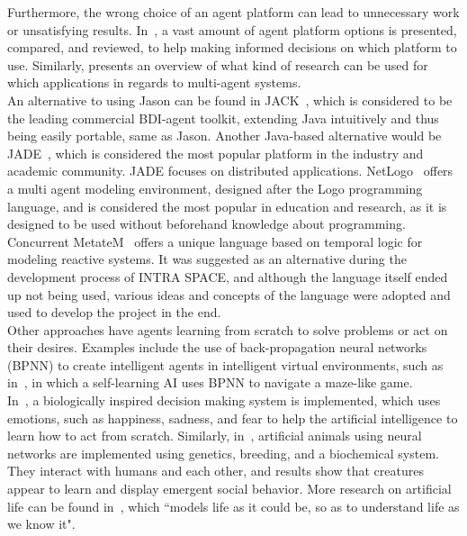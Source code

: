 \documentclass[draft,final]{vutinfth} %
\begin{document}
Furthermore, the wrong choice of an agent platform can lead to unnecessary work or unsatisfying results. 
In~\cite{kravari2015survey}, a vast amount of agent platform options is presented, compared, and reviewed, to help making informed decisions on which platform to use. 
Similarly, \cite{oliveira1999multi} presents an overview of what kind of research can be used for which applications in regards to multi-agent systems. \\
An alternative to using Jason can be found in JACK~\cite{Winikoff2005}, which is considered to be the leading commercial BDI-agent toolkit, extending Java intuitively and thus being easily portable, same as Jason. 
Another Java-based alternative would be JADE~\cite{bellifemine1999jade}, which is considered the most popular platform in the industry and academic community. 
JADE focuses on distributed applications. 
NetLogo~\cite{tisue2004netlogo} offers a multi agent modeling environment, designed after the Logo programming language, and is considered the most popular in education and research, as it is designed to be used without beforehand knowledge about programming. \\
Concurrent MetateM~\cite{Barringer1995} offers a unique language based on temporal logic for modeling reactive systems. 
It was suggested as an alternative during the development process of INTRA SPACE, and although the language itself ended up not being used, various ideas and concepts of the language were adopted and used to develop the project in the end. \\
Other approaches have agents learning from scratch to solve problems or act on their desires.
Examples include the use of back-propagation neural networks (BPNN) to create intelligent agents in intelligent virtual environments, such as in~\cite{jia2007entertainment}, in which a self-learning AI uses BPNN to navigate a maze-like game. \\
In~\cite{salichs2012new}, a biologically inspired decision making system is implemented, which uses emotions, such as happiness, sadness, and fear to help the artificial intelligence to learn how to act from scratch.
Similarly, in~\cite{grand1998creatures}, artificial animals using neural networks are implemented using genetics, breeding, and a biochemical system. 
They interact with humans and each other, and results show that creatures appear to learn and display emergent social behavior. 
More research on artificial life can be found in~\cite{maes1995artificial}, which ``models life as it could be, so as to understand life as we know it".
\end{document}
